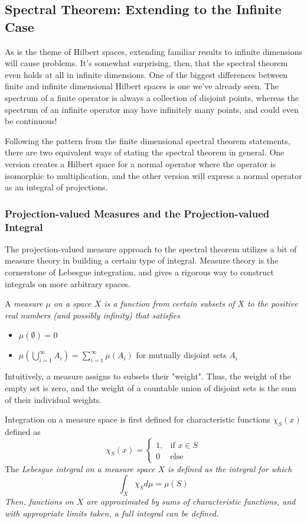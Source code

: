 \subsection{Spectral Theorem: Extending to the Infinite Case}

As is the theme of Hilbert spaces, extending familiar results to infinite
dimensions will cause problems. It's somewhat surprising, then, that the
spectral theorem even holds at all in infinite dimensions. One of the biggest
differences between finite and infinite dimensional Hilbert spaces is one we've
already seen. The spectrum of a finite operator is always a collection of
disjoint points, whereas the spectrum of an infinite operator may have
infinitely many points, and could even be continuous!

Following the pattern from the finite dimensional spectral theorem statements,
there are two equivalent ways of stating the spectral theorem in general. One
version creates a Hilbert space for a normal operator where the operator is
isomorphic to multiplication, and the other version will express a normal
operator as an integral of projections.

\subsubsection{Projection-valued Measures and the Projection-valued Integral}
The projection-valued measure approach to the spectral theorem utilizes a bit of
measure theory in building a certain type of integral. Measure theory is the
cornerstone of Lebesgue integration, and gives a rigorous way to construct
integrals on more arbitrary spaces.

A \em measure \em $\mu$ on a space $X$ is a function from certain subsets of $X$
to the positive real numbers (and possibly infinity) that satisfies
\begin{itemize}
    \itemsep0em
    \item $\mu(\emptyset) = 0$
    \item $\mu(\bigcup_{i=1}^{\infty}A_i) = \sum_{i=1}^{\infty}\mu(A_i)$ for mutually
        disjoint sets $A_i$

\end{itemize}

Intuitively, a measure assigns to subsets their "weight". Thus, the weight of
the empty set is zero, and the weight of a countable union of disjoint sets is
the sum of their individual weights.

Integration on a measure space is first defined for characteristic functions
$\chi_S(x)$ defined as
\[
    \chi_S(x) =
    \begin{cases}
        1, &\text{if }x\in S\\
        0 &\text{else}
    \end{cases}
    \]
The \em Lebesgue integral \em on a measure space $X$ is defined as the integral
for which
\[
    \int_X \chi_S d\mu = \mu(S)
\]
Then, functions on $X$ are approximated by sums of characteristic functions, and
with appropriate limits taken, a full integral can be defined.


